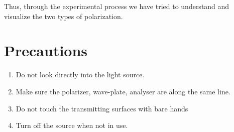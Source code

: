 \documentclass{article}
\begin{document}
Thus, through the experimental process we have tried to understand and visualize the two types of polarization. 



\section{Precautions}
\begin{enumerate}
    \item Do not look directly into the  light source.
    \item Make sure the polarizer, wave-plate, analyser are along the same line.
    \item Do not touch the transmitting surfaces with bare hands
    \item Turn off the source when not in use.
\end{enumerate}
\end{document}
